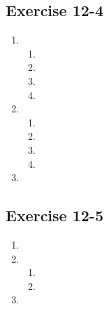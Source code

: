 \subsection{Exercise 12-4} %
\begin{enumerate}[itemsep=6pt, label=\textbf{\arabic*}. ] 
\item %
\begin{enumerate}[noitemsep, label=\textbf{\alph*}. ]
 \item
\item
\item 
\item
\end{enumerate}
\item %
\begin{enumerate}[noitemsep, label=\textbf{\alph*}. ]
 \item
\item
\item 
\item
\end{enumerate}
\item %

\end{enumerate}
\subsection{Exercise 12-5} %
\begin{enumerate}[noitemsep, label=\textbf{\arabic*}. ] 
 \item %
\item %
\begin{enumerate}[noitemsep, label=\textbf{(\alph*)} ] 
\item %
\item %
\end{enumerate}
\item %
\end{enumerate}
% 

